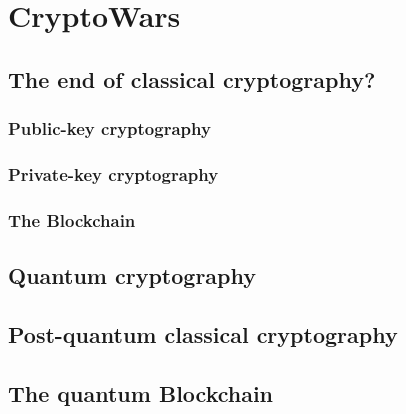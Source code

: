%
%

\section{CryptoWars\texttrademark}



\subsection{The end of classical cryptography?}

\subsubsection{Public-key cryptography}

\subsubsection{Private-key cryptography}

\subsubsection{The Blockchain}

\subsection{Quantum cryptography}

\subsection{Post-quantum classical cryptography}

\subsection{The quantum Blockchain}